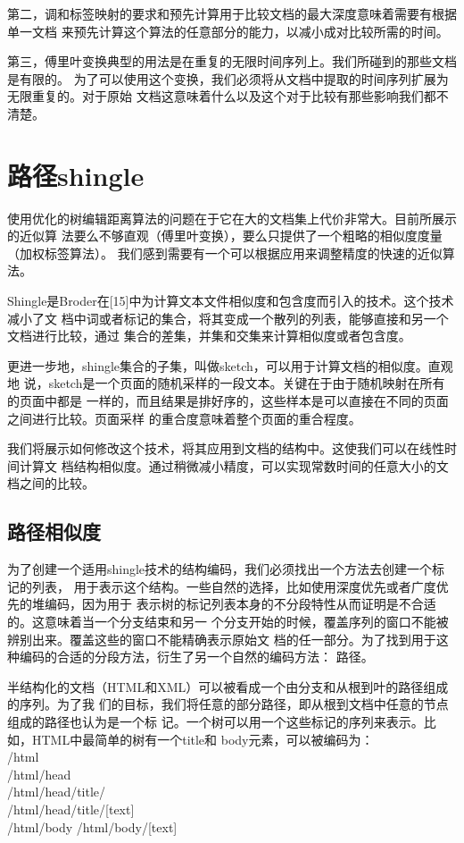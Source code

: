 第二，调和标签映射的要求和预先计算用于比较文档的最大深度意味着需要有根据单一文档
来预先计算这个算法的任意部分的能力，以减小成对比较所需的时间。

第三，傅里叶变换典型的用法是在重复的无限时间序列上。我们所碰到的那些文档是有限的。
为了可以使用这个变换，我们必须将从文档中提取的时间序列扩展为无限重复的。对于原始
文档这意味着什么以及这个对于比较有那些影响我们都不清楚。

\section{路径shingle}
使用优化的树编辑距离算法的问题在于它在大的文档集上代价非常大。目前所展示的近似算
法要么不够直观（傅里叶变换），要么只提供了一个粗略的相似度度量（加权标签算法）。
我们感到需要有一个可以根据应用来调整精度的快速的近似算法。

Shingle是Broder在[15]中为计算文本文件相似度和包含度而引入的技术。这个技术减小了文
档中词或者标记的集合，将其变成一个散列的列表，能够直接和另一个文档进行比较，通过
集合的差集，并集和交集来计算相似度或者包含度。

更进一步地，shingle集合的子集，叫做sketch，可以用于计算文档的相似度。直观地
说，sketch是一个页面的随机采样的一段文本。关键在于由于随机映射在所有的页面中都是
一样的，而且结果是排好序的，这些样本是可以直接在不同的页面之间进行比较。页面采样
的重合度意味着整个页面的重合程度。

我们将展示如何修改这个技术，将其应用到文档的结构中。这使我们可以在线性时间计算文
档结构相似度。通过稍微减小精度，可以实现常数时间的任意大小的文档之间的比较。

\subsection{路径相似度}
为了创建一个适用shingle技术的结构编码，我们必须找出一个方法去创建一个标记的列表，
用于表示这个结构。一些自然的选择，比如使用深度优先或者广度优先的堆编码，因为用于
表示树的标记列表本身的不分段特性从而证明是不合适的。这意味着当一个分支结束和另一
个分支开始的时候，覆盖序列的窗口不能被辨别出来。覆盖这些的窗口不能精确表示原始文
档的任一部分。为了找到用于这种编码的合适的分段方法，衍生了另一个自然的编码方法：
路径。

半结构化的文档（HTML和XML）可以被看成一个由分支和从根到叶的路径组成的序列。为了我
们的目标，我们将任意的部分路径，即从根到文档中任意的节点组成的路径也认为是一个标
记。一个树可以用一个这些标记的序列来表示。比如，HTML中最简单的树有一个title和
body元素，可以被编码为：\\
/html\\
/html/head\\
/html/head/title/\\
/html/head/title/[text]\\
/html/body
/html/body/[text]

